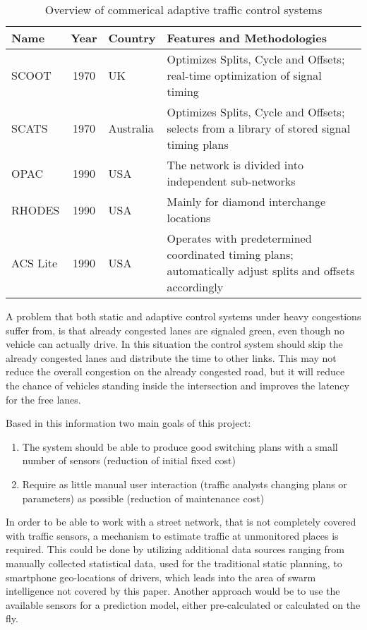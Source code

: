 \begin{table}[ht!]
	\centering
	\begin{longtabu}{l|cl|p{9cm}}
		\rowfont{\bfseries}
		Name & Year & Country & Features and Methodologies \\
		\hline\hline
		SCOOT & 1970 & UK & Optimizes Splits, Cycle and Offsets; real-time optimization of signal timing \\
		\hline
		SCATS & 1970 & Australia & Optimizes Splits, Cycle and Offsets; selects from a library of stored signal timing plans \\
		\hline
		OPAC & 1990 & USA & The network is divided into independent sub-networks \\
		\hline
		RHODES & 1990 & USA & Mainly for diamond interchange locations \\
		\hline
		ACS Lite & 1990 & USA & Operates with predetermined coordinated timing plans; automatically adjust splits and offsets accordingly \\
	\end{longtabu}
	\label{atcs_overview}
	\caption{Overview of commerical adaptive traffic control systems}
\end{table}

A problem that both static and adaptive control systems under heavy congestions suffer from, is that already congested lanes are signaled green, even though no vehicle can actually drive. In this situation the control system should skip the already congested lanes and distribute the time to other links. This may not reduce the overall congestion on the already congested road, but it will reduce the chance of vehicles standing inside the intersection and improves the latency for the free lanes.

Based in this information two main goals of this project:

\begin{enumerate}
	\item The system should be able to produce good switching plans with a small number of sensors (reduction of initial fixed cost)
	\item Require as little manual user interaction (traffic analysts changing plans or parameters) as possible (reduction of maintenance cost)
\end{enumerate}

In order to be able to work with a street network, that is not completely covered with traffic sensors, a mechanism to estimate traffic at unmonitored places is required. This could be done by utilizing additional data sources ranging from manually collected statistical data, used for the traditional static planning, to smartphone geo-locations of drivers, which leads into the area of swarm intelligence not covered by this paper. Another approach would be to use the available sensors for a prediction model, either pre-calculated or calculated on the fly.

